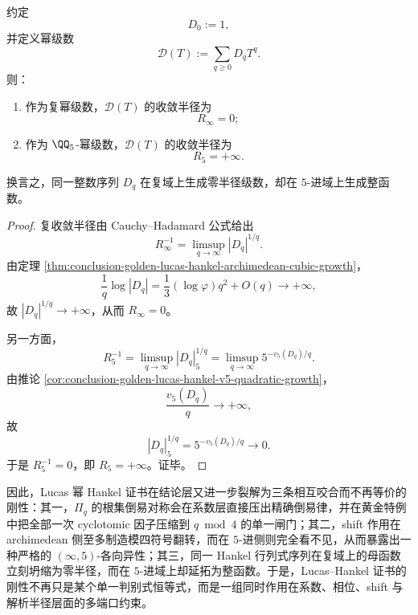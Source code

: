 \begin{theorem}\label{thm:conclusion-golden-hankel-ogf-radius-dichotomy}
约定
\[
D_0:=1,
\]
并定义幂级数
\[
\mathcal D(T):=\sum_{q\ge 0}D_qT^q.
\]
则：
\begin{enumerate}
  \item 作为复幂级数，\(\mathcal D(T)\) 的收敛半径为
  \[
  R_\infty=0;
  \]
  \item 作为 \(\QQ_5\)-幂级数，\(\mathcal D(T)\) 的收敛半径为
  \[
  R_5=+\infty.
  \]
\end{enumerate}
换言之，同一整数序列 \(D_q\) 在复域上生成零半径级数，却在 \(5\)-进域上生成整函数。
\end{theorem}
\begin{proof}
复收敛半径由 Cauchy--Hadamard 公式给出
\[
R_\infty^{-1}
=
\limsup_{q\to\infty}|D_q|^{1/q}.
\]
由定理 \ref{thm:conclusion-golden-lucas-hankel-archimedean-cubic-growth}，
\[
\frac1q\log |D_q|
=
\frac13(\log\varphi)q^2+O(q)\to +\infty,
\]
故 \(|D_q|^{1/q}\to +\infty\)，从而 \(R_\infty=0\)。

另一方面，
\[
R_5^{-1}
=
\limsup_{q\to\infty}|D_q|_5^{1/q}
=
\limsup_{q\to\infty}5^{-v_5(D_q)/q}.
\]
由推论 \ref{cor:conclusion-golden-lucas-hankel-v5-quadratic-growth}，
\[
\frac{v_5(D_q)}{q}\to+\infty,
\]
故
\[
|D_q|_5^{1/q}=5^{-v_5(D_q)/q}\to 0.
\]
于是 \(R_5^{-1}=0\)，即 \(R_5=+\infty\)。证毕。
\end{proof}

\noindent
因此，Lucas 幂 Hankel 证书在结论层又进一步裂解为三条相互咬合而不再等价的刚性：其一，\(\Pi_q\) 的根集倒易对称会在系数层直接压出精确倒易律，并在黄金特例中把全部一次 cyclotomic 因子压缩到 \(q\bmod 4\) 的单一闸门；其二，shift 作用在 archimedean 侧至多制造模四符号翻转，而在 \(5\)-进侧则完全看不见，从而暴露出一种严格的 \((\infty,5)\)-各向异性；其三，同一 Hankel 行列式序列在复域上的母函数立刻坍缩为零半径，而在 \(5\)-进域上却延拓为整函数。于是，Lucas–Hankel 证书的刚性不再只是某个单一判别式恒等式，而是一组同时作用在系数、相位、shift 与解析半径层面的多端口约束。

\endinput
